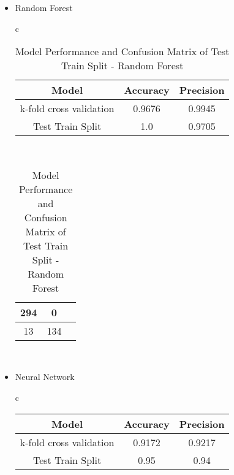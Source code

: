 \documentclass{article}
\begin{document}
\begin{itemize}
\begin{itemize}
\begin{itemize}
        \item Random Forest
            \begin{table}[htbp]
            \centering
            \begin{tabular}{c} %
                \begin{tabular}{|c|c|c|}
                \hline
                Model & Accuracy & Precision \\
                \hline
                k-fold cross validation & 0.9676 & 0.9945 \\
                \hline
                Test Train Split & 1.0 & 0.9705 \\
                \hline
                \end{tabular}
                \vspace{5mm} \\ %

                
                \begin{tabular}{|c|c|c|}
                \hline
                294 & 0 \\
                \hline
                13 & 134 \\
                \hline
                \end{tabular} \\
            \end{tabular}
            \caption{Model Performance and Confusion Matrix of Test Train Split - Random Forest}
            \label{tab:combined_table}
            \end{table}
        
        \item Neural Network
            
            \begin{table}[H]
            \centering
            \begin{tabular}{c} %
                \begin{tabular}{|c|c|c|}
                \hline
                Model & Accuracy & Precision \\
                \hline
                k-fold cross validation & 0.9172 & 0.9217 \\
                \hline
                Test Train Split & 0.95 & 0.94 \\
                \hline
                \end{tabular}
                \vspace{5mm} \\ %


\end{tabular}
\end{table}
\end{itemize}
\end{itemize}
\end{itemize}
\end{document}
